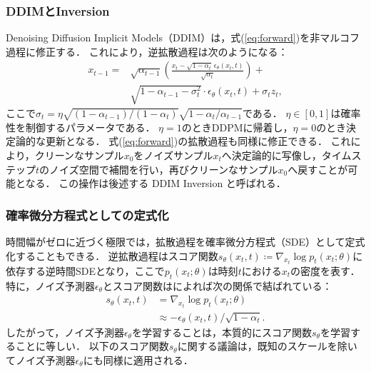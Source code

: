 \documentclass[MIRU,submit]{miru2026j}
\theoremstyle{definition}
\begin{document}
\subsubsection{DDIMとInversion}
Denoising Diffusion Implicit Models（DDIM）\cite{Song2021a}は，式(\ref{eq:forward})を非マルコフ過程に修正する．
これにより，逆拡散過程は次のようになる：
\begin{equation}
    \label{eq:backward_ddim}
    \begin{aligned}
        \textstyle {x}_{t-1} = &\textstyle \sqrt{\alpha_{t-1}}\left(\frac{{x_t}-\sqrt{1-\alpha_{t}}\,{\epsilon}_\theta({x}_t,t)}{\sqrt{\alpha_t}}\right) +\\
        &\textstyle \sqrt{1-\alpha_{t-1}-\sigma_t^2}\cdot{\epsilon}_\theta({x}_t,t) + \sigma_t{z}_t,
    \end{aligned}
\end{equation}
ここで$\sigma_t=\eta\sqrt{(1-\alpha_{t-1})/(1-\alpha_t)}\sqrt{1-\alpha_t/\alpha_{t-1}}$である．
$\eta\in[0,1]$は確率性を制御するパラメータである．
$\eta=1$のときDDPMに帰着し，$\eta=0$のとき決定論的な更新となる．
式(\ref{eq:forward})の拡散過程も同様に修正できる．
これにより，クリーンなサンプル$x_0$をノイズサンプル$x_t$へ決定論的に写像し，タイムステップ$t$のノイズ空間で補間を行い，再びクリーンなサンプル$x_0$へ戻すことが可能となる．
この操作は後述する DDIM Inversion と呼ばれる．

\subsubsection{確率微分方程式としての定式化}
時間幅がゼロに近づく極限では，拡散過程を確率微分方程式（SDE）として定式化することもできる\cite{Song2021b}．
逆拡散過程はスコア関数$s_\theta(x_t,t)\coloneq\nabla_{x_t}\log p_t(x_t;\theta)$に依存する逆時間SDEとなり，ここで$p_t(x_t;\theta)$は時刻$t$における$x_t$の密度を表す．
特に，ノイズ予測器$\epsilon_\theta$とスコア関数は\cite{Luo2022}によれば次の関係で結ばれている：
\begin{equation}
    \label{eq:score_noise_relation}
    \begin{aligned}
    \textstyle
    s_\theta(x_t,t)
    &=\textstyle\nabla_{{x}_t} \log p_t({x}_t;\theta)\\
    &\textstyle\approx - {\epsilon}_\theta({x}_t, t)/\sqrt{1-\alpha_t}.
    \end{aligned}
\end{equation}
したがって，ノイズ予測器$\epsilon_\theta$を学習することは，本質的にスコア関数$s_\theta$を学習することに等しい．
以下のスコア関数$s_\theta$に関する議論は，既知のスケールを除いてノイズ予測器$\epsilon_\theta$にも同様に適用される．
\end{document}
